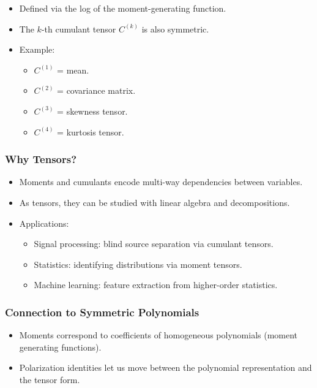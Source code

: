 \documentclass[
  letterpaper,
  DIV=11,
  numbers=noendperiod]{scrreprt}
\providecommand{\tightlist}{%
  \setlength{\itemsep}{0pt}\setlength{\parskip}{0pt}}
\begin{document}
\begin{itemize}
\item
  Defined via the log of the moment-generating function.
\item
  The \(k\)-th cumulant tensor \(C^{(k)}\) is also symmetric.
\item
  Example:

  \begin{itemize}
  \tightlist
  \item
    \(C^{(1)}\) = mean.
  \item
    \(C^{(2)}\) = covariance matrix.
  \item
    \(C^{(3)}\) = skewness tensor.
  \item
    \(C^{(4)}\) = kurtosis tensor.
  \end{itemize}
\end{itemize}

\subsubsection{Why Tensors?}\label{why-tensors}

\begin{itemize}
\item
  Moments and cumulants encode multi-way dependencies between variables.
\item
  As tensors, they can be studied with linear algebra and
  decompositions.
\item
  Applications:

  \begin{itemize}
  \tightlist
  \item
    Signal processing: blind source separation via cumulant tensors.
  \item
    Statistics: identifying distributions via moment tensors.
  \item
    Machine learning: feature extraction from higher-order statistics.
  \end{itemize}
\end{itemize}

\subsubsection{Connection to Symmetric
Polynomials}\label{connection-to-symmetric-polynomials}

\begin{itemize}
\tightlist
\item
  Moments correspond to coefficients of homogeneous polynomials (moment
  generating functions).
\item
  Polarization identities let us move between the polynomial
  representation and the tensor form.
\end{itemize}
\end{document}
